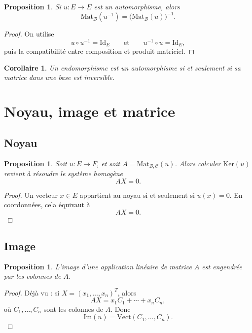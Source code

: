 \documentclass[11pt,a4paper]{article}
\newtheorem{proposition}[definition]{Proposition}
\newtheorem{corollaire}[definition]{Corollaire}
\theoremstyle{remark}
\newcommand{\Vect}{\mathrm{Vect}}
\newcommand{\Ker}{\mathrm{Ker}}
\newcommand{\Img}{\mathrm{Im}}
\newcommand{\id}{\mathrm{Id}}
\begin{document}
\begin{proposition}
Si \(u:E\to E\) est un automorphisme, alors
\[
\mathrm{Mat}_{\mathcal B}(u^{-1})
=
\big(\mathrm{Mat}_{\mathcal B}(u)\big)^{-1}.
\]
\end{proposition}

\begin{proof}
On utilise
\[
u\circ u^{-1}=\id_E
\qquad \text{et} \qquad
u^{-1}\circ u=\id_E,
\]
puis la compatibilité entre composition et produit matriciel.
\end{proof}

\begin{corollaire}
Un endomorphisme est un automorphisme si et seulement si sa matrice dans une base est inversible.
\end{corollaire}

\section{Noyau, image et matrice}

\subsection{Noyau}

\begin{proposition}
Soit \(u:E\to F\), et soit \(A=\mathrm{Mat}_{\mathcal B,\mathcal C}(u)\).  
Alors calculer \(\Ker(u)\) revient à résoudre le système homogène
\[
AX=0.
\]
\end{proposition}

\begin{proof}
Un vecteur \(x\in E\) appartient au noyau si et seulement si \(u(x)=0\). En coordonnées, cela équivaut à
\[
AX=0.
\]
\end{proof}

\subsection{Image}

\begin{proposition}
L’image d’une application linéaire de matrice \(A\) est engendrée par les colonnes de \(A\).
\end{proposition}

\begin{proof}
Déjà vu : si \(X=(x_1,\dots,x_n)^T\), alors
\[
AX=x_1C_1+\cdots+x_nC_n,
\]
où \(C_1,\dots,C_n\) sont les colonnes de \(A\). Donc
\[
\Img(u)=\Vect(C_1,\dots,C_n).
\]
\end{proof}
\end{document}
